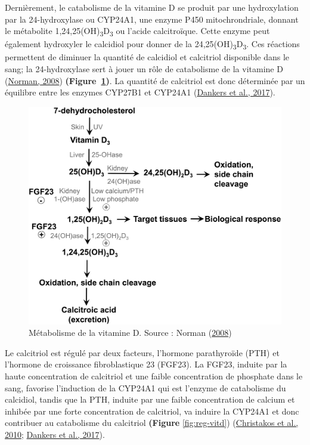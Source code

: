 \documentclass[
  a4paper,
  DIV=11,
  numbers=noendperiod,
  listof=totoc]{scrreprt}
\begin{document}
Dernièrement, le catabolisme de la vitamine D se produit par une
hydroxylation par la 24-hydroxylase ou CYP24A1, une enzyme P450
mitochrondriale, donnant le métabolite
1,24,25(OH)\textsubscript{3}D\textsubscript{3} ou l'acide calcitroïque.
Cette enzyme peut également hydroxyler le calcidiol pour donner de la
24,25(OH)\textsubscript{3}D\textsubscript{3}. Ces réactions permettent
de diminuer la quantité de calcidiol et calcitriol disponible dans le
sang; la 24-hydroxylase sert à jouer un rôle de catabolisme de la
vitamine D (\protect\hyperlink{ref-Norman.2008}{Norman, 2008})
\textbf{(Figure~\ref{fig-metabolism-vitd})}. La quantité de calcitriol
est donc déterminée par un équilibre entre les enzymes CYP27B1 et
CYP24A1 (\protect\hyperlink{ref-Dankers.2017}{Dankers et al., 2017}).

\begin{figure}

{\centering \includegraphics{figures/vitamin-d-metabolism.png}

}

\caption{\label{fig-metabolism-vitd}Métabolisme de la vitamine D. Source
: Norman (\protect\hyperlink{ref-Norman.2008}{2008})}

\end{figure}

Le calcitriol est régulé par deux facteurs, l'hormone parathyroïde (PTH)
et l'hormone de croissance fibroblastique 23 (FGF23). La FGF23, induite
par la haute concentration de calcitriol et une faible concentration de
phosphate dans le sang, favorise l'induction de la CYP24A1 qui est
l'enzyme de catabolisme du calcidiol, tandis que la PTH, induite par une
faible concentration de calcium et inhibée par une forte concentration
de calcitriol, va induire la CYP24A1 et donc contribuer au catabolisme
du calcitriol \textbf{(Figure} \ref{fig:reg-vitd})
(\protect\hyperlink{ref-Christakos.2010}{Christakos et al., 2010};
\protect\hyperlink{ref-Dankers.2017}{Dankers et al., 2017}).
\end{document}
